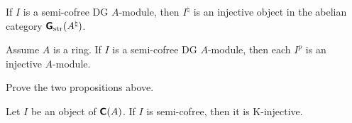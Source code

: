 \begin{prop} \label{prop:3375}
If $I$ is a semi-cofree DG $A$-module, then $I^{\natural}$ is 
an injective object in the abelian category 
$\boldsymbol{\mathsf{G}}_{\mathrm{str}}(A^{\natural})$. 
\end{prop}

\begin{prop} \label{prop:3185}
Assume $A$ is a ring. If $I$ is a semi-cofree DG $A$-module, then each $I^p$ is 
an injective $A$-module. 
\end{prop}

\begin{exer} \label{exer:3185}
Prove the two propositions above. 
\end{exer}

\begin{thm} \label{thm:1665}
Let $I$ be an object of $\boldsymbol{\mathsf{C}}(A)$. If $I$ is semi-cofree, then it is 
K-injective.
\end{thm}

